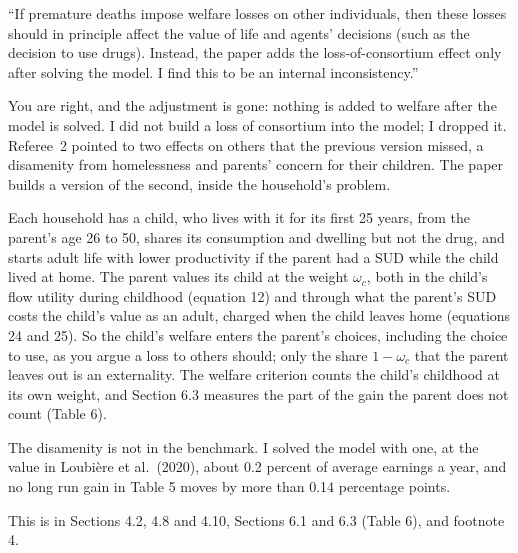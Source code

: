 \documentclass[11pt]{article}
\begin{document}
\begin{referee}
``If premature deaths impose welfare losses on other individuals, then these
losses should in principle affect the value of life and agents' decisions (such as
the decision to use drugs). Instead, the paper adds the loss-of-consortium effect
only after solving the model. I find this to be an internal inconsistency.''
\end{referee}
\begin{response}
\concede You are right, and the adjustment is gone: nothing is added to welfare
after the model is solved. I did not build a loss of consortium into the model; I
dropped it. Referee~2 pointed to two effects on others that the previous version
missed, a disamenity from homelessness and parents' concern for their children.
The paper builds a version of the second, inside the household's problem.

Each household has a child, who lives with it for its first 25 years, from the
parent's age 26 to 50, shares its consumption and dwelling but not the drug, and
starts adult life with lower productivity if the parent had a SUD while the child
lived at home. The parent values its child at the weight $\omega_c$, both in the
child's flow utility during childhood (equation 12) and through what the parent's
SUD costs the child's value as an adult, charged when the child leaves home
(equations 24 and 25). So the child's welfare enters the parent's choices,
including the choice to use, as you argue a loss to others should; only the share
$1-\omega_c$ that the parent leaves out is an externality. The welfare criterion
counts the child's childhood at its own weight, and Section 6.3 measures the part
of the gain the parent does not count (Table 6).

The disamenity is not in the benchmark. I solved the model with one, at the value
in Loubi\`ere et al.\ (2020), about 0.2 percent of average earnings a year, and no
long run gain in Table 5 moves by more than 0.14 percentage points.

This is in Sections 4.2, 4.8 and 4.10, Sections 6.1 and 6.3 (Table 6), and
footnote 4.
\end{response}
\end{document}

